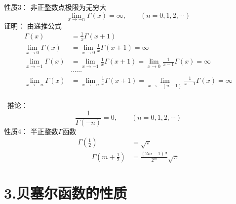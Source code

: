 \begin{frame}
	\alert{性质3：} 非正整数点极限为无穷大
	\begin{equation*}
		\lim\limits_{x\to -n }\Gamma(x)=\infty, \qquad (n=0,1,2, \cdots)
	\end{equation*}	
	\alert{证明：}  由递推公式
	\begin{equation*}
	\begin{split}
		\Gamma(x)&=\frac{1}{x} \Gamma(x+1) \\
		\lim\limits_{x\to 0 }	\Gamma(x)&=	\lim\limits_{x\to 0 } \frac{1}{x} \Gamma(x+1) =\infty \\
		\lim\limits_{x\to -1 }	\Gamma(x)&=\lim\limits_{x\to -1 } \frac{1}{x} \Gamma(x+1) =  \lim\limits_{x\to 0 } \frac{1}{x-1} \Gamma(x) =\infty \\
		& \cdots \cdots \\
		\lim\limits_{x\to -n }	\Gamma(x)&=\lim\limits_{x\to -n } \frac{1}{x} \Gamma(x+1) = \lim\limits_{x\to -(n-1) } \frac{1}{x-1} \Gamma(x) =\infty \\
	\end{split}
	\end{equation*}	
\end{frame}	

\begin{frame}
	 推论： 
	\begin{equation*}
		\frac{1}{\Gamma(-n)} =0, \qquad (n=0,1,2, \cdots)
	\end{equation*}	 \vspace{2cm}
	\alert{性质4：} 半正整数$\Gamma$函数 
	\begin{equation*}
		\begin{split}
		\Gamma(\frac{1}{2}) &=\sqrt{\pi} \\ 
		\qquad  \Gamma(m+\frac{1}{2}) &= \frac{(2m-1)!!}{2^m} \sqrt{\pi}
		\end{split}	
	\end{equation*}	
\end{frame}	

\section{3.贝塞尔函数的性质}


